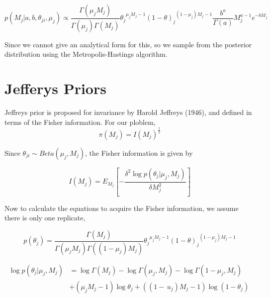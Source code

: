 \documentclass[11pt,reqno]{amsart}
\begin{document}
\begin{equation}
	p( M_{j} |a, b, \theta_{ji},\mu_j) \propto \frac{\Gamma \left({\mu}_{j} {M}_{j} \right)}{\Gamma \left({\mu }_{j}\right)\Gamma \left({M}_{j}\right)} {{\theta}_{j}}^{{\mu}_{j}{M}_{j}-1}{\left(1-\theta\right)_{j}}^{\left(1-{\mu}_{j}\right){M}_{j}-1}\frac{{b}^{a}}{\Gamma \left({a}\right)}M_{j}^{a-1}{e}^{-bM_{j}}
\end{equation}

Since we cannot give an analytical form for this, so we sample from the posterior distribution using the Metropolis-Hastings algorithm.

\section{Jefferys Priors}\label{sec:model_structure}
Jeffreys prior is proposed for invariance by Harold Jeffreys (1946), and defined in terms of the Fisher information. For our ploblem,
\begin{equation}\label{eqn:JefferyPrior}
\pi\left({M}_{j}\right)= I\left({M}_{j}\right)^{\frac{1}{2}}
\end{equation}

Since ${\theta }_{ji}\sim Beta\left( {\mu }_{j},{M}_{j}\right)$, the Fisher information is given by

\begin{equation}\label{equ:JefferyInference}
I\left({M}_{j}\right)={E}_{{M}_{j}}\left[ -\frac{\delta ^{2}\log p\left(\theta _{j}|\mu_{j},M_{j}\right)}{\delta M^{2}_{j}}\right]
\end{equation}

Now to calculate the equations to acquire the Fisher information, we assume there is only one replicate,

\begin{equation}\label{eqn:Betapdf}
p\left({\theta }_{j} \right)= \frac{\Gamma \left({M}_{j} \right)}{\Gamma \left({\mu }_{j} {M}_{j}\right)\Gamma \left(( 1-{\mu }_{j}){M}_{j}\right)} {{\theta}_{j}}^{{\mu}_{j}{M}_{j}-1}{\left(1-\theta\right)_{j}}^{\left(1-{\mu}_{j}\right){M}_{j}-1}
\end{equation}

\begin{equation}\label{equ:JefferyInference1}
\begin{split}
\log p\left(\theta_{j}|\mu_{j},M_{j}\right)& =\log \Gamma \left(M_{j}\right)-\log \Gamma\left(\mu_{j},M_{j}\right)- \log \Gamma\left(1-\mu_{j},M_{j}\right)\\
& + (\mu_{j}M_{j}-1)\log\theta_{j} + ((1-\,u_{j})M_{j}-1)\log(1-\theta_{j})\
\end{split}
\end{equation}
\end{document}
